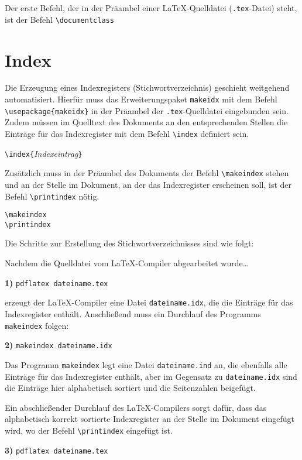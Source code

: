 Der erste Befehl, der in der Präambel einer \LaTeX-Quelldatei (\verb!.tex!-Datei) steht, ist der Befehl \verb!\documentclass!
\begin{document}
\section{Index}

Die Erzeugung eines
Indexregisters (Stichwortverzeichnis)
geschieht weitgehend automatisiert.
Hierfür muss das Erweiterungspaket \verb!makeidx! mit dem Befehl \verb!\usepackage{makeidx}! in der Präambel der \verb!.tex!-Quelldatei eingebunden sein.
Zudem müssen im Quelltext des Dokuments an den 
entsprechenden Stellen die 
Einträge für das Indexregister mit dem Befehl \verb!\index! definiert sein. 

\begin{boxedminipage}{\textwidth}
\texttt{\textbackslash index\{}\textsl{Indexeintrag}\texttt{\}} 
\end{boxedminipage}

Zusätzlich muss in der Präambel des Dokuments der Befehl \verb!\makeindex!  stehen
und an der Stelle im Dokument, an der das Indexregister erscheinen soll, 
ist der Befehl \verb!\printindex!  nötig.


\begin{boxedminipage}{\textwidth}
\texttt{\textbackslash makeindex} \\
\texttt{\textbackslash printindex} 
\end{boxedminipage}

Die Schritte zur Erstellung des Stichwortverzeichnisses 
sind wie folgt:

Nachdem die Quelldatei vom \LaTeX-Compiler abgearbeitet wurde\dots

\textbf{1)} \verb!pdflatex dateiname.tex!

erzeugt der \LaTeX-Compiler eine Datei 
\verb!dateiname.idx!, die 
die Einträge für das Indexregister 
enthält. Anschließend muss ein Durchlauf des Programms
\verb!makeindex! folgen:

\textbf{2)} \verb!makeindex dateiname.idx!

Das Programm \verb!makeindex! legt eine Datei \verb!dateiname.ind! an, 
die ebenfalls alle Einträge für das Indexregister enthält,
aber im Gegensatz zu \verb!dateiname.idx! sind die Einträge hier
alphabetisch sortiert und die Seitenzahlen beigefügt.

Ein abschließender Durchlauf des \LaTeX-Compilers sorgt dafür, dass das alphabetisch 
korrekt sortierte Indexregister an der Stelle im Dokument eingefügt 
wird, wo der Befehl \verb!\printindex! eingefügt ist.

\textbf{3)} \verb!pdflatex dateiname.tex!
\end{document}
